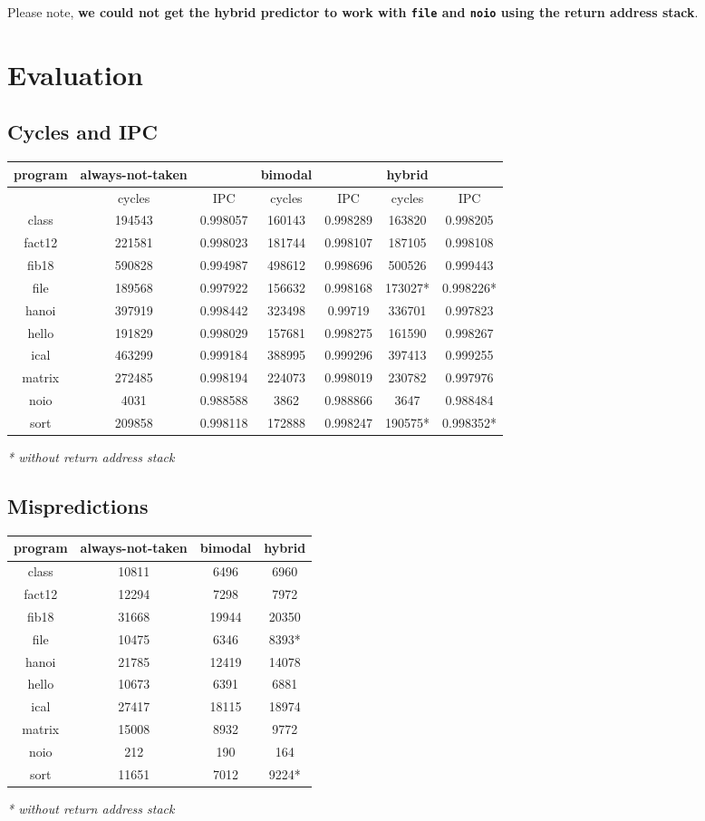 \documentclass[a4paper,11pt]{article}
\begin{document}
Please note, \textbf{we could not get the hybrid predictor to work with \texttt{file} and \texttt{noio} using the return address stack}.

\section{Evaluation}
\subsection{Cycles and IPC}
\begin{tabular}{| c | c | c | c | c | c | c |}
  \hline
  program & always-not-taken & & bimodal & & hybrid & \\
  \hline
  & cycles & IPC & cycles & IPC & cycles & IPC\\
  \hline
  class & 194543 & 0.998057 & 160143 & 0.998289 & 163820 & 0.998205\\
  fact12 & 221581 & 0.998023 & 181744 & 0.998107 & 187105 & 0.998108\\
  fib18 & 590828 & 0.994987 & 498612 & 0.998696 & 500526 & 0.999443\\
  file & 189568 & 0.997922 & 156632 & 0.998168 & 173027* & 0.998226*\\
  hanoi & 397919 & 0.998442 & 323498 & 0.99719 & 336701 & 0.997823\\
  hello & 191829 & 0.998029 & 157681 & 0.998275 & 161590 & 0.998267\\
  ical & 463299 & 0.999184 & 388995 & 0.999296 & 397413 & 0.999255\\
  matrix & 272485 & 0.998194 & 224073 & 0.998019 & 230782 & 0.997976 \\
  noio & 4031 & 0.988588 & 3862 & 0.988866 & 3647 & 0.988484\\
  sort & 209858 & 0.998118 & 172888 & 0.998247 & 190575* & 0.998352* \\
  \hline
\end{tabular}

\textit{* without return address stack}

\subsection{Mispredictions}
\begin{tabular}{| c | c | c | c |}
  \hline
  program & always-not-taken & bimodal & hybrid \\
  \hline
  class & 10811 & 6496 & 6960 \\
  fact12 & 12294 & 7298 & 7972 \\
  fib18 & 31668 & 19944 & 20350 \\
  file & 10475 & 6346 & 8393*\\
  hanoi & 21785 & 12419 & 14078\\
  hello & 10673 & 6391 & 6881\\
  ical & 27417 & 18115 & 18974\\
  matrix & 15008 & 8932 & 9772\\
  noio & 212 & 190 & 164\\
  sort & 11651 & 7012 & 9224* \\
  \hline
\end{tabular}

\textit{* without return address stack}
\end{document}
